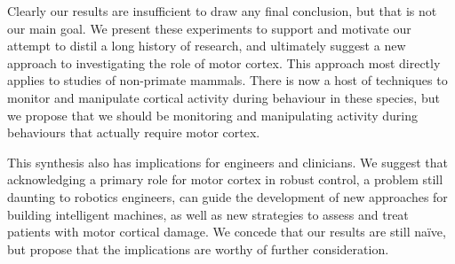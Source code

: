 Clearly our results are insufficient to draw any final conclusion, but that is not our main goal. We present these experiments to support and motivate our attempt to distil a long history of research, and ultimately suggest a new approach to investigating the role of motor cortex. This approach most directly applies to studies of non-primate mammals. There is now a host of techniques to monitor and manipulate cortical activity during behaviour in these species, but we propose that we should be monitoring and manipulating activity during behaviours that actually require motor cortex.

This synthesis also has implications for engineers and clinicians. We suggest that acknowledging a primary role for motor cortex in robust control, a problem still daunting to robotics engineers, can guide the development of new approaches for building intelligent machines, as well as new strategies to assess and treat patients with motor cortical damage. We concede that our results are still naïve, but propose that the implications are worthy of further consideration.

